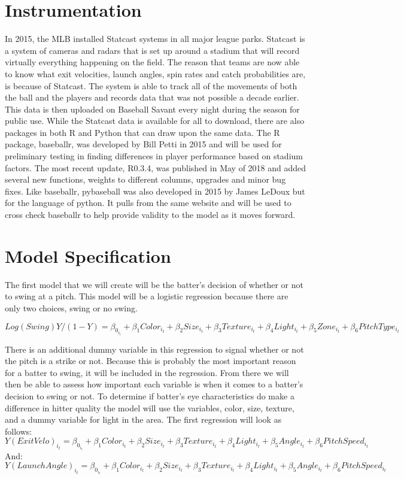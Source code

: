 \documentclass{article}
\begin{document}
\begin{doublespace}
\section{Instrumentation}
In 2015, the MLB installed Statcast systems in all major league parks. Statcast is a system of cameras and radars that is set up around a stadium that will record virtually everything happening on the field. The reason that teams are now able to know what exit velocities, launch angles, spin rates and catch probabilities are, is because of Statcast. The system is able to track all of the movements of both the ball and the players and records data that was not possible a decade earlier. This data is then uploaded on Baseball Savant every night during the season for public use. While the Statcast data is available for all to download, there are also packages in both R and Python that can draw upon the same data. 
The R package, baseballr, was developed by Bill Petti in 2015 and will be used for preliminary testing in finding differences in player performance based on stadium factors. The most recent update, R0.3.4, was published in May of 2018 and added several new functions, weights to different columns, upgrades and minor bug fixes. Like baseballr, pybaseball was also developed in 2015 by James LeDoux but for the language of python. It pulls from the same website and will be used to cross check baseballr to help provide validity to the model as it moves forward.	 

\section{Model Specification}
The first model that we will create will be the batter’s decision of whether or not to swing at a pitch. This model will be a logistic regression because there are only two choices, swing or no swing. 
   
$$Log(Swing) Y/(1-Y)=\beta_0_i_t + \beta_1Color_i_t+ \beta_2Size_i_t+ \beta_3Texture_i_t+ \beta_4Light_i_t+ \beta_5Zone_i_t+ \beta_6Pitch Type_i_t$$ 



There is an additional dummy variable in this regression to signal whether or not the pitch is a strike or not. Because this is probably the most important reason for a batter to swing, it will be included in the regression. From there we will then be able to assess how important each variable is when it comes to a batter’s decision to swing or not.  
To determine if batter’s eye characteristics do make a difference in hitter quality the model will use the variables, color, size, texture, and a dummy variable for light in the area. The first regression will look as follows:
$$Y(ExitVelo)_i_t=\beta_0_i_t + \beta_1Color_i_t+ \beta_2Size_i_t+ \beta_3Texture_i_t+ \beta_4Light_i_t+ \beta_5Angle_i_t+ \beta_6PitchSpeed_i_t$$
And:
$$Y(LaunchAngle)_i_t=\beta_0_i_t + \beta_1Color_i_t+ \beta_2Size_i_t+ \beta_3Texture_i_t+ \beta_4Light_i_t+ \beta_5Angle_i_t+ \beta_6PitchSpeed_i_t$$



\end{doublespace}
\end{document}
